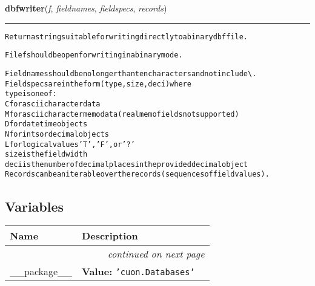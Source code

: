     \label{cuon:Databases:xbase:dbfwriter}

    \vspace{0.5ex}

\hspace{.8\funcindent}\begin{boxedminipage}{\funcwidth}

    \raggedright \textbf{dbfwriter}(\textit{f}, \textit{fieldnames}, \textit{fieldspecs}, \textit{records})

    \vspace{-1.5ex}

    \rule{\textwidth}{0.5\fboxrule}
\setlength{\parskip}{2ex}
\begin{alltt}
Return a string suitable for writing directly to a binary dbf file.

File f should be open for writing in a binary mode.

Fieldnames should be no longer than ten characters and not include {\textbackslash}.
Fieldspecs are in the form (type, size, deci) where
    type is one of:
        C for ascii character data
        M for ascii character memo data (real memo fields not supported)
        D for datetime objects
        N for ints or decimal objects
        L for logical values 'T', 'F', or '?'
    size is the field width
    deci is the number of decimal places in the provided decimal object
Records can be an iterable over the records (sequences of field values).
\end{alltt}

\setlength{\parskip}{1ex}
    \end{boxedminipage}



  \subsection{Variables}

    \vspace{-1cm}
\hspace{\varindent}\begin{longtable}{|p{\varnamewidth}|p{\vardescrwidth}|l}
\cline{1-2}
\cline{1-2} \centering \textbf{Name} & \centering \textbf{Description}& \\
\cline{1-2}
\endhead\cline{1-2}\multicolumn{3}{r}{\small\textit{continued on next page}}\\\endfoot\cline{1-2}
\endlastfoot\raggedright \_\-\_\-p\-a\-c\-k\-a\-g\-e\-\_\-\_\- & \raggedright \textbf{Value:} 
{\tt \texttt{'}\texttt{cuon.Databases}\texttt{'}}&\\
\cline{1-2}
\end{longtable}

